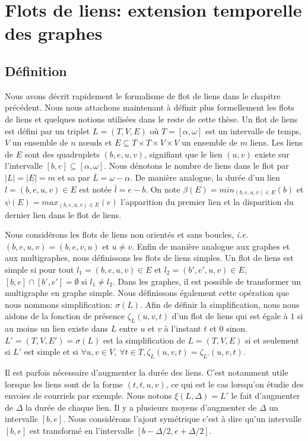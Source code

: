 \chapter{Flots de liens: extension temporelle des graphes}
\minitoc
\label{chap:def_flot}

\section{Définition}
\label{sec:definition}

Nous avons décrit rapidement le formalisme de flot de liens dans le chapitre précédent.
Nous nous attachons maintenant à définir plus formellement les flots de liens et quelques notions utilisées dans le reste de cette thèse.
Un flot de liens est défini par un triplet $L=(T,V,E)$ où $T=[\alpha, \omega]$ est un intervalle de temps, $V$ un ensemble de $n$ n\oe uds et $E\subseteq T\times T \times V \times V$ un ensemble de $m$ liens.
Les liens de $E$ sont des quadruplets $(b,e,u,v)$, signifiant que le lien $(u, v)$ existe sur l'intervalle $[b,e] \subseteq [\alpha,\omega]$.
Nous dénotons le nombre de liens dans le flot par $|L|=|E|=m$ et sa par $\bar{L}=\omega-\alpha$.
De manière analogue, la durée d'un lien $l=(b,e,u,v) \in E$ est notée   $\bar{l}=e-b$.
On note $\beta(E)= min_{(b,e,u,v) \in E} (b)$ et $\psi(E)= max_{(b,e,u,v) \in E} (e)$ l'apparition du premier lien et la disparition du dernier lien dans le flot de liens.

Nous considérons les flots de liens non orientés et sans boucles, \emph{i.e.}$(b,e,u,v)=(b,e,v,u)$ et $u \neq v$.
Enfin de manière analogue aux graphes et aux multigraphes, nous définissons les flots de liens simples.
Un flot de liens est simple si pour tout $l_1=(b,e,u,v) \in E$ et $l_2=(b',e',u, v) \in E$, $[b,e]\cap [b', e'] = \emptyset$ si $l_1 \neq l_2$.
Dans les graphes, il est possible de transformer un multigraphe en graphe simple.
Nous définissons également cette opération que nous nommons simplification: $\sigma(L)$.
Afin de définir la simplification, nous nous aidons de la fonction de présence $\zeta_{L}(u,v,t)$ d'un flot de liens qui est égale à $1$ si au moins un lien existe dans $L$ entre $u$ et $v$ à l'instant $t$ et $0$ sinon.
$L'=(T,V,E')= \sigma(L)$ est la simplification de $L=(T,V,E)$ si et seulement si $L'$ est simple et si $\forall u,v \in V,\ \forall t\in T, \zeta_{L}(u,v,t)= \zeta_{L'}(u,v,t)$.

Il est parfois nécessaire d'augmenter la durée des liens.
C'est notamment utile lorsque les liens sont de la forme $(t,t,u,v)$, ce qui est le cas lorsqu'on étudie des envoies de courriels par exemple.
Nous notons $\xi(L,\Delta)=L'$ le fait d'augmenter de $\Delta$ la durée de chaque lien.
Il y a plusieurs moyens d'augmenter de $\Delta$ un intervalle $[b,e]$.
Nous considérons l'ajout symétrique c'est à dire qu'un intervalle $[b,e]$ est transformé en l'intervalle $[b-\Delta/2,e+\Delta/2]$.

